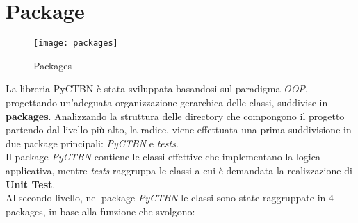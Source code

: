   \section{Package}
  \begin{figure}[H]
    \texttt{[image: packages]}
    \centering
    \caption{Packages}
  \end{figure}

  La libreria PyCTBN è stata sviluppata basandosi sul paradigma \textit{OOP}, progettando un'adeguata
  organizzazione gerarchica delle classi, suddivise in \textbf{packages}.
  Analizzando la struttura delle directory che compongono il progetto partendo dal livello più alto, 
  la radice, viene effettuata una prima suddivisione in due package principali: \textit{PyCTBN} e
  \textit{tests}.\\
  Il package \textit{PyCTBN} contiene le classi effettive che implementano la logica applicativa,
  mentre \textit{tests} raggruppa le classi a cui è demandata la realizzazione di \textbf{Unit Test}.\\
  Al secondo livello, nel package \textit{PyCTBN} le classi sono state raggruppate in 4 packages, 
  in base alla funzione che svolgono:
  

